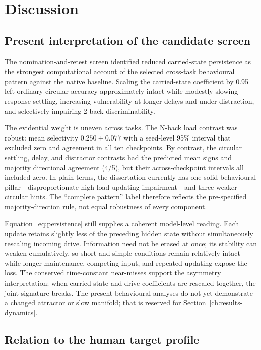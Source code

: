 \section{Discussion}
\label{ch:discussion}

\subsection{Present interpretation of the candidate screen}

The nomination-and-retest screen identified reduced carried-state persistence
as the strongest computational account of the selected cross-task behavioural
pattern against the native baseline. Scaling the carried-state coefficient by
0.95 left ordinary circular accuracy approximately intact while modestly
slowing response settling, increasing vulnerability at longer delays and under
distraction, and selectively impairing 2-back discriminability.

The evidential weight is uneven across tasks. The N-back load contrast was
robust: mean selectivity $0.250\pm0.077$ with a seed-level 95\% interval that
excluded zero and agreement in all ten checkpoints. By contrast, the circular
settling, delay, and distractor contrasts had the predicted mean signs and
majority directional agreement (4/5), but their across-checkpoint intervals all
included zero. In plain terms, the dissertation currently has one solid
behavioural pillar---disproportionate high-load updating impairment---and three
weaker circular hints. The ``complete pattern'' label therefore reflects the
pre-specified majority-direction rule, not equal robustness of every component.

Equation~\ref{eq:persistence} still supplies a coherent model-level reading.
Each update retains slightly less of the preceding hidden state without
simultaneously rescaling incoming drive. Information need not be erased at
once; its stability can weaken cumulatively, so short and simple conditions
remain relatively intact while longer maintenance, competing input, and
repeated updating expose the loss. The conserved time-constant near-misses
support the asymmetry interpretation: when carried-state and drive coefficients
are rescaled together, the joint signature breaks. The present behavioural
analyses do not yet demonstrate a changed attractor or slow manifold; that is
reserved for Section~\ref{ch:results-dynamics}.

\subsection{Relation to the human target profile}

